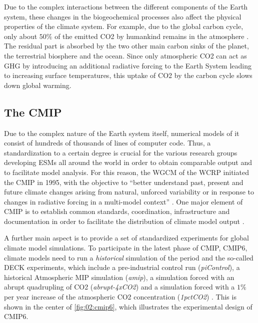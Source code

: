 Due to the complex interactions between the different components of the Earth
system, these changes in the biogeochemical processes also affect the physical
properties of the climate system. For example, due to the global carbon cycle,
only about $50 \unit{\%}$ of the emitted \ac{CO2} by humankind remains in the
atmosphere \autocite{Friedlingstein2020}. The residual part is absorbed by the
two other main carbon sinks of the planet, the terrestrial biosphere and the
ocean. Since only atmospheric \ac{CO2} can act as \ac{GHG} by introducing an
additional radiative forcing to the Earth System leading to increasing surface
temperatures, this uptake of \ac{CO2} by the carbon cycle slows down global
warming.


\subsection{The \acf{CMIP}}
\label{subsec:02:cmip}

Due to the complex nature of the Earth system itself, numerical models of it
consist of hundreds of thousands of lines of computer code. Thus, a
standardization to a certain degree is crucial for the various research groups
developing \acp{ESM} all around the world in order to obtain comparable output
and to facilitate model analysis. For this reason, the \ac{WGCM} of the
\ac{WCRP} initiated the \acf{CMIP} in 1995, with the objective to
\enquote{better understand past, present and future climate changes arising
  from natural, unforced variability or in response to changes in radiative
  forcing in a multi-model context} \autocite{WCRP2020}. One major element of
\ac{CMIP} is to establish common standards, coordination, infrastructure and
documentation in order to facilitate the distribution of climate model output
\autocite{Eyring2016, Juckes2020}.

A further main aspect is to provide a set of standardized experiments for
global climate model simulations. To participate in the latest phase of
\ac{CMIP}, \acs{CMIP}6, climate models need to run a \emph{historical}
simulation of the period  and the so-called \ac{DECK}
experiments, which include a pre-industrial control run (\emph{piControl}), a
historical Atmospheric \ac{MIP} simulation (\emph{amip}), a simulation forced
with an abrupt quadrupling of \ac{CO2} (\emph{abrupt-4xCO2}) and a simulation
forced with a $1 \unit{\%}$ per year increase of the atmospheric \ac{CO2}
concentration (\emph{1pctCO2}) \autocite{Eyring2016}. This is shown in the
center of \cref{fig:02:cmip6}, which illustrates the experimental design of
\acs{CMIP}6.

